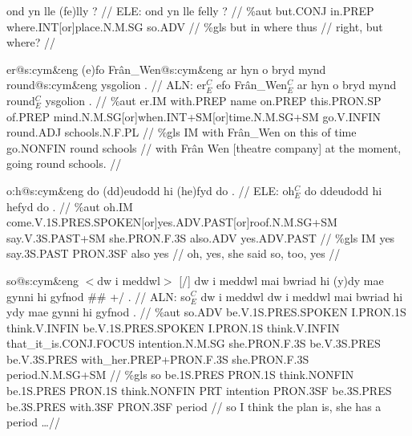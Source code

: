 \documentclass[a4paper,10pt]{article}
\begin{document}
\ex
\begingl[lingstyle=gergl]
\glchat ond yn lle (fe)lly ? //
\glsurface ELE:  ond yn lle felly ?  //
\glauto \%aut  but{\scriptsize .CONJ} in{\scriptsize .PREP} where{\scriptsize .INT[or]place.N.M.SG} so{\scriptsize .ADV}   //
\glmanual \%gls  but in where thus   //
\gleng right, but where? //
\endgl
\xe

\ex
\begingl[lingstyle=gergl]
\glchat er@s:cym\&eng (e)fo Frân\_Wen@s:cym\&eng ar hyn o bryd mynd round@s:cym\&eng ysgolion . //
\glsurface ALN:  er$^{C}_{E}$ efo Frân\_Wen$^{C}_{E}$ ar hyn o bryd mynd round$^{C}_{E}$ ysgolion .  //
\glauto \%aut  er{\scriptsize .IM} with{\scriptsize .PREP} name on{\scriptsize .PREP} this{\scriptsize .PRON.SP} of{\scriptsize .PREP} mind{\scriptsize .N.M.SG[or]when.INT+SM[or]time.N.M.SG+SM} go{\scriptsize .V.INFIN} round{\scriptsize .ADJ} schools{\scriptsize .N.F.PL}   //
\glmanual \%gls  IM with Frân\_Wen on this of time go{\scriptsize .NONFIN} round schools   //
\gleng with Frân Wen [theatre company] at the moment, going round schools. //
\endgl
\xe

\ex
\begingl[lingstyle=gergl]
\glchat o:h@s:cym\&eng do (dd)eudodd hi (he)fyd do . //
\glsurface ELE:  oh$^{C}_{E}$ do ddeudodd hi hefyd do .  //
\glauto \%aut  oh{\scriptsize .IM} come{\scriptsize .V.1S.PRES.SPOKEN[or]yes.ADV.PAST[or]roof.N.M.SG+SM} say{\scriptsize .V.3S.PAST+SM} she{\scriptsize .PRON.F.3S} also{\scriptsize .ADV} yes{\scriptsize .ADV.PAST}   //
\glmanual \%gls  IM yes say{\scriptsize .3S.PAST} PRON{\scriptsize .3SF} also yes   //
\gleng oh, yes, she said so, too, yes //
\endgl
\xe

\ex
\begingl[lingstyle=gergl]
\glchat so@s:cym\&eng $<$dw i meddwl$>$ [/] dw i meddwl mai bwriad hi (y)dy mae gynni hi gyfnod \#\# +/ . //
\glsurface ALN:  so$^{C}_{E}$ dw i meddwl dw i meddwl mai bwriad hi ydy mae gynni hi gyfnod .  //
\glauto \%aut  so{\scriptsize .ADV} be{\scriptsize .V.1S.PRES.SPOKEN} I{\scriptsize .PRON.1S} think{\scriptsize .V.INFIN} be{\scriptsize .V.1S.PRES.SPOKEN} I{\scriptsize .PRON.1S} think{\scriptsize .V.INFIN} that\_it\_is{\scriptsize .CONJ.FOCUS} intention{\scriptsize .N.M.SG} she{\scriptsize .PRON.F.3S} be{\scriptsize .V.3S.PRES} be{\scriptsize .V.3S.PRES} with\_her{\scriptsize .PREP+PRON.F.3S} she{\scriptsize .PRON.F.3S} period{\scriptsize .N.M.SG+SM}   //
\glmanual \%gls  so be{\scriptsize .1S.PRES} PRON{\scriptsize .1S} think{\scriptsize .NONFIN} be{\scriptsize .1S.PRES} PRON{\scriptsize .1S} think{\scriptsize .NONFIN} PRT intention PRON{\scriptsize .3SF} be{\scriptsize .3S.PRES} be{\scriptsize .3S.PRES} with{\scriptsize .3SF} PRON{\scriptsize .3SF} period   //
\gleng so I think the plan is, she has a period \dots  //
\endgl
\xe
\end{document}
